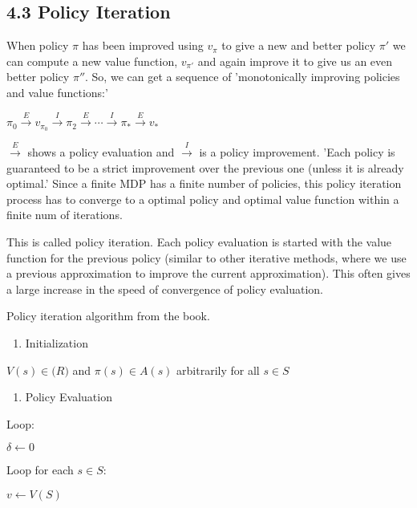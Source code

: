 \documentclass[11pt]{article}
\providecommand{\tightlist}{%
      \setlength{\itemsep}{0pt}\setlength{\parskip}{0pt}}
\begin{document}
    \subsection{4.3 Policy Iteration}\label{policy-iteration}

    When policy \(\pi\) has been improved using \(v_\pi\) to give a new and
better policy \(\pi'\) we can compute a new value function, \(v_{\pi'}\)
and again improve it to give us an even better policy \(\pi''\). So, we
can get a sequence of 'monotonically improving policies and value
functions:'

\(\pi_0 \stackrel{E}{\rightarrow} v_{\pi_0} \stackrel{I}{\rightarrow} \pi_2 \stackrel{E}{\rightarrow} \dotsb \stackrel{I}{\rightarrow} \pi_* \stackrel{E}{\rightarrow} v_*\)

\(\stackrel{E}{\rightarrow}\) shows a policy evaluation and
\(\stackrel{I}{\rightarrow}\) is a policy improvement. 'Each policy is
guaranteed to be a strict improvement over the previous one (unless it
is already optimal.' Since a finite MDP has a finite number of policies,
this policy iteration process has to converge to a optimal policy and
optimal value function within a finite num of iterations.

    This is called policy iteration. Each policy evaluation is started with
the value function for the previous policy (similar to other iterative
methods, where we use a previous approximation to improve the current
approximation). This often gives a large increase in the speed of
convergence of policy evaluation.

    Policy iteration algorithm from the book.

\begin{enumerate}
\def\labelenumi{\arabic{enumi}.}
\tightlist
\item
  Initialization
\end{enumerate}

\(V(s) \in \mathbb(R)\) and \(\pi(s) \in A(s)\) arbitrarily for all
\(s \in S\)

\begin{enumerate}
\def\labelenumi{\arabic{enumi}.}
\setcounter{enumi}{1}
\tightlist
\item
  Policy Evaluation
\end{enumerate}

Loop:

\(\delta \leftarrow 0\)

Loop for each \(s \in S\):

\(v \leftarrow V(S)\)
\end{document}
